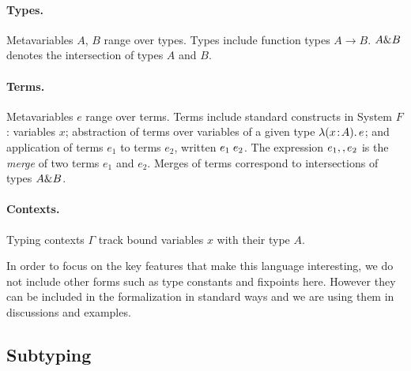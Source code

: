 \paragraph{Types.} Metavariables $A$, $B$ range over types. Types include
function types $A \to B$. $A \& B$ denotes the
intersection of types $A$ and $B$.

\paragraph{Terms.} Metavariables $e$ range over terms.  Terms include standard
constructs in System $F$: variables $x$; abstraction of terms over variables of
a given type $\lambda (x \!:\! A).\, e$; and application of terms $e_1$ to terms $e_2$, written
$e_1 \; e_2$. The expression $e_1 ,, e_2$ is the
\emph{merge} of two terms $e_1$ and $e_2$.
Merges of terms correspond to intersections of types $A \& B$.

\paragraph{Contexts.} Typing contexts $ \Gamma $ track bound variables $x$ with their type $A$.


In order to focus on the key features that make this language interesting, we do
not include other forms such as type constants
and fixpoints here. However they can be included in the formalization in
standard ways and we are using them in discussions and examples.


\subsection{Subtyping}


